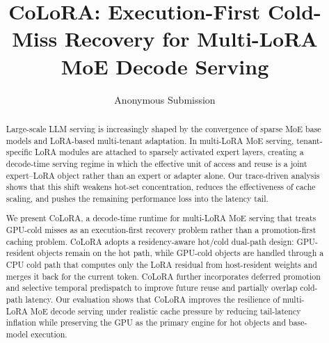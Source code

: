 \documentclass[sigplan,anonymous,review,nonacm]{acmart}
\begin{document}
\title{CoLoRA: Execution-First Cold-Miss Recovery for Multi-LoRA MoE Decode Serving}

\author{Anonymous Submission}


\begin{abstract}
Large-scale LLM serving is increasingly shaped by the convergence of sparse MoE base models and LoRA-based multi-tenant adaptation. In multi-LoRA MoE serving, tenant-specific LoRA modules are attached to sparsely activated expert layers, creating a decode-time serving regime in which the effective unit of access and reuse is a joint expert--LoRA object rather than an expert or adapter alone. Our trace-driven analysis shows that this shift weakens hot-set concentration, reduces the effectiveness of cache scaling, and pushes the remaining performance loss into the latency tail.

We present CoLoRA, a decode-time runtime for multi-LoRA MoE serving that treats GPU-cold misses as an execution-first recovery problem rather than a promotion-first caching problem. CoLoRA adopts a residency-aware hot/cold dual-path design: GPU-resident objects remain on the hot path, while GPU-cold objects are handled through a CPU cold path that computes only the LoRA residual from host-resident weights and merges it back for the current token. CoLoRA further incorporates deferred promotion and selective temporal predispatch to improve future reuse and partially overlap cold-path latency. Our evaluation shows that CoLoRA improves the resilience of multi-LoRA MoE decode serving under realistic cache pressure by reducing tail-latency inflation while preserving the GPU as the primary engine for hot objects and base-model execution.
\end{abstract}
\end{document}
